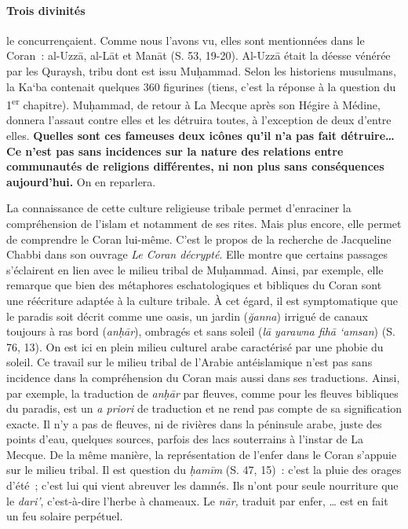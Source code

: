 \paragraph{Trois divinités} le concurrençaient. Comme nous l'avons vu, elles sont
mentionnées dans le Coran~: al-Uzzā, al-Lāt et Manāt (S. 53, 19-20).
Al-Uzzā était la déesse vénérée par les Quraysh, tribu dont est issu
Muḥammad. Selon les historiens musulmans, la Ka`ba contenait quelques
360 figurines (tiens, c'est la réponse à la question du
1\textsuperscript{er} chapitre). Muḥammad, de retour à La Mecque après
son Hégire à Médine, donnera l'assaut contre elles et les détruira
toutes, à l'exception de deux d'entre elles. \textbf{Quelles sont ces
fameuses deux icônes qu'il n'a pas fait
détruire}\textbf{\ldots{}
Ce n'est pas sans incidences sur la nature des relations entre
communautés de religions différentes, ni non plus sans conséquences
aujourd'hui.} On en reparlera.

La connaissance de cette culture religieuse tribale permet d'enraciner
la compréhension de l'islam et notamment de ses rites. Mais plus encore,
elle permet de comprendre le Coran lui-même. C'est le propos de la
recherche de Jacqueline Chabbi dans son ouvrage \emph{Le Coran
décrypté}. Elle montre que certains passages s'éclairent en lien avec le
milieu tribal de Muḥammad. Ainsi, par exemple, elle remarque que bien
des métaphores eschatologiques et bibliques du Coran sont une réécriture
adaptée à la culture tribale. À cet égard, il est symptomatique que le
paradis soit décrit comme une oasis, un jardin (\emph{ğanna}) irrigué de
canaux toujours à ras bord (\emph{anḥār}), ombragés et sans soleil
(\emph{lā yarawna fihā `amsan}) (S. 76, 13). On est
ici en plein milieu culturel arabe caractérisé par une phobie du soleil.
Ce travail sur le milieu tribal de l'Arabie antéislamique n'est pas sans
incidence dans la compréhension du Coran mais aussi dans ses
traductions. Ainsi, par exemple, la traduction de \emph{anḥār} par
fleuves, comme pour les fleuves bibliques du paradis, est un \emph{a
priori} de traduction et ne rend pas compte de sa signification exacte.
Il n'y a pas de fleuves, ni de rivières dans la péninsule arabe, juste
des points d'eau, quelques sources, parfois des lacs souterrains à
l'instar de La Mecque. De la même manière, la représentation de l'enfer
dans le Coran s'appuie sur le milieu tribal. Il est question du
\emph{ḥamīm} (S. 47, 15)~: c'est la pluie des orages d'été~; c'est lui
qui vient abreuver les damnés. Ils n'ont pour seule nourriture que le
\emph{dari'}, c'est-à-dire l'herbe à chameaux. Le \emph{nār,} traduit
par enfer, \ldots{} est en fait un feu solaire perpétuel.

